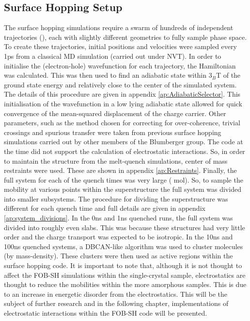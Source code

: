 \subsection{Surface Hopping Setup}
The surface hopping simulations require a swarm of hundreds of independent trajectories (), each with slightly different geometries to fully sample phase space. To create these trajectories, initial positions and velocities were sampled every 1ps from a classical MD simulation (carried out under NVT). In order to initialise the (electron-hole) wavefunction for each trajectory, the Hamiltonian was calculated. This was then used to find an adiabatic state within 3$_{B}$T of the ground state energy and relatively close to the center of the simulated system. The details of this procedure are given in appendix \ref{ap:AdiabaticSelector}. This initialisation of the wavefunction in a low lying adiabatic state allowed for quick convergence of the mean-squared displacement of the charge carrier. Other parameters, such as the method chosen for correcting for over-coherence, trivial crossings and spurious transfer were taken from previous surface hopping simulations carried out by other members of the Blumberger group. The code at the time did not support the calculation of electrostatic interactions. So, in order to maintain the structure from the melt-quench simulations, center of mass restraints were used. These are shown in appendix \ref{ap:Restraints}. Finally, the full system for each of the  quench times was very large ( mol). So, to sample the mobility at various points within the superstructure the full system was divided into smaller subsystems. The procedure for dividing the superstructure was different for each quench time and full details are given in appendix \ref{ap:system_divisions}. In the 0ns and 1ns quenched runs, the full system was divided into  roughly even slabs. This was because these structures had very little order and the charge transport was expected to be isotropic. In the 10ns and 100ns quenched systems, a DBCAN-like algorithm \cite{DBSCAN} was used to cluster molecules (by mass-density). These clusters were then used as active regions within the surface hopping code. It is important to note that, although it is not thought to affect the FOB-SH simulations within the single-crystal sample, electrostatics are thought to reduce the mobilities within the more amorphous samples. This is due to an increase in energetic disorder \cite{ESEffectOnMob} from the electrostatics. This will be the subject of further research and in the following chapter,  implementations of electrostatic interactions within the FOB-SH code will be presented.

